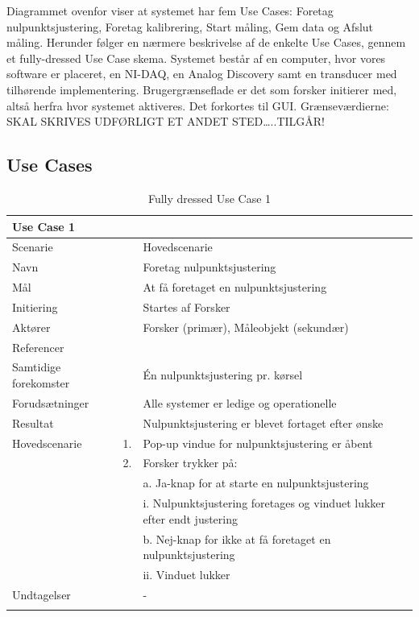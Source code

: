 Diagrammet ovenfor viser at systemet har fem Use Cases: Foretag nulpunktsjustering, Foretag kalibrering, Start måling, Gem data og Afslut måling. Herunder følger en nærmere beskrivelse af de enkelte Use Cases, gennem et fully-dressed Use Case skema. 
Systemet består af en computer, hvor vores software er placeret, en NI-DAQ, en Analog Discovery samt en transducer med tilhørende implementering. 
Brugergrænseflade er det som forsker initierer med, altså herfra hvor systemet aktiveres. Det forkortes til GUI. Grænseværdierne: SKAL SKRIVES UDFØRLIGT ET ANDET STED…..TILGÅR!


\newpage
\subsection{Use Cases}

\begin{longtabu} to  %
	{\large \textbf{Use Case 1}} && \\
	\toprule
	Scenarie 				&&	Hovedscenarie\\
	Navn 					&& 	Foretag nulpunktsjustering\\
	Mål 					&& 	At få foretaget en nulpunktsjustering\\
	Initiering 				&& 	Startes af Forsker\\
	Aktører 				&& 	Forsker (primær), Måleobjekt (sekundær)\\
	Referencer 				&& 	\\
	Samtidige forekomster  	&& 	Én nulpunktsjustering pr. kørsel \\
	Forudsætninger 			&&	Alle systemer er ledige og operationelle\\ 
	Resultat 				&& 	Nulpunktsjustering er blevet fortaget efter ønske\\ \midrule
	Hovedscenarie 			&    1. 	&	Pop-up vindue for nulpunktsjustering er åbent\\				 	
							&    2. 	& 	Forsker trykker på:\\ 
							& 			&	a. Ja-knap for at starte en nulpunktsjustering\\[-1ex]
							& 			&		 i. Nulpunktsjustering foretages og vinduet lukker efter endt justering\\[-1ex]
							& 			&  	b. Nej-knap for ikke at få foretaget en nulpunktsjustering\\[-1ex]
							& 			&   ii. Vinduet lukker\\[-1ex]	
	Undtagelser 			&			& 	-  \\ \bottomrule
	
	\caption{Fully dressed Use Case 1}
	\label{UC1}
\end{longtabu}

